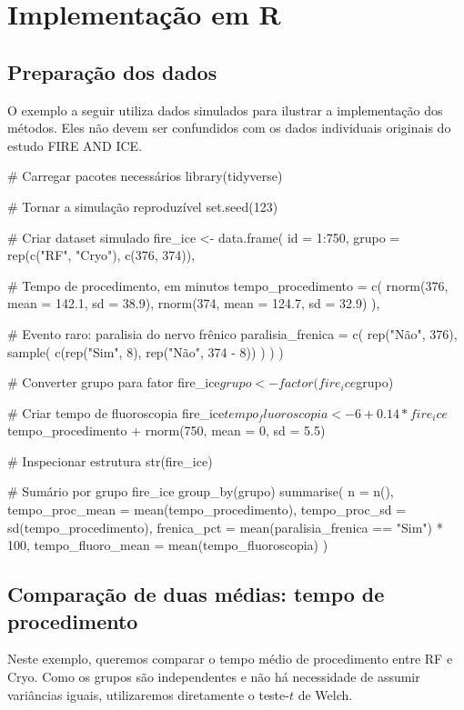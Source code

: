 \section{Implementação em R}

\subsection{Preparação dos dados}

O exemplo a seguir utiliza dados simulados para ilustrar a implementação dos
métodos. Eles não devem ser confundidos com os dados individuais originais do
estudo FIRE AND ICE.

\begin{code}
# Carregar pacotes necessários
library(tidyverse)

# Tornar a simulação reproduzível
set.seed(123)

# Criar dataset simulado
fire_ice <- data.frame(
  id = 1:750,
  grupo = rep(c("RF", "Cryo"), c(376, 374)),

  # Tempo de procedimento, em minutos
  tempo_procedimento = c(
    rnorm(376, mean = 142.1, sd = 38.9),
    rnorm(374, mean = 124.7, sd = 32.9)
  ),

  # Evento raro: paralisia do nervo frênico
  paralisia_frenica = c(
    rep("Não", 376),
    sample(
      c(rep("Sim", 8), rep("Não", 374 - 8))
    )
  )
)

# Converter grupo para fator
fire_ice$grupo <- factor(fire_ice$grupo)

# Criar tempo de fluoroscopia
fire_ice$tempo_fluoroscopia <-
  6 +
  0.14 * fire_ice$tempo_procedimento +
  rnorm(750, mean = 0, sd = 5.5)

# Inspecionar estrutura
str(fire_ice)

# Sumário por grupo
fire_ice %
  group_by(grupo) %
  summarise(
    n = n(),
    tempo_proc_mean = mean(tempo_procedimento),
    tempo_proc_sd = sd(tempo_procedimento),
    frenica_pct =
      mean(paralisia_frenica == "Sim") * 100,
    tempo_fluoro_mean =
      mean(tempo_fluoroscopia)
  )
\end{code}

\subsection{Comparação de duas médias: tempo de procedimento}

Neste exemplo, queremos comparar o tempo médio de procedimento entre RF e
Cryo. Como os grupos são independentes e não há necessidade de assumir variâncias iguais, utilizaremos diretamente o teste-$t$ de Welch.

